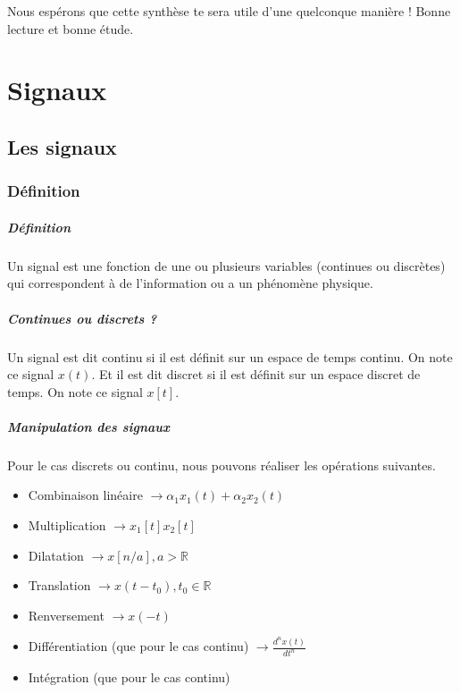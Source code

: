 \documentclass{report}
\begin{document}
Nous espérons que cette synthèse te sera utile d'une quelconque manière ! Bonne lecture et bonne étude.


\part{Signaux}

\chapter{Les signaux}
\section{Définition}
\subsubsection{Définition}
Un signal est une fonction de une ou plusieurs variables (continues ou discrètes) qui correspondent à de l'information ou a un phénomène physique.

\subsubsection{Continues ou discrets ?}
Un signal est dit continu si il est définit sur un espace de temps continu. On note ce signal $x(t)$. Et il est dit discret si il est définit sur un espace discret de temps. On note ce signal $x[t]$.

\subsubsection{Manipulation des signaux}
Pour le cas discrets ou continu, nous pouvons réaliser les opérations suivantes.
\begin{itemize}
\item Combinaison linéaire $\rightarrow \alpha_{1}x_{1}(t) + \alpha_{2}x_{2}(t)$
\item Multiplication $ \rightarrow x_{1}[t]x_{2}[t]$
\item Dilatation $ \rightarrow x[n/a], a > \mathbb{R}$
\item Translation $ \rightarrow x(t - t_0), t_0 \in \mathbb{R}$
\item Renversement $ \rightarrow x(-t)$
\item Différentiation (que pour le cas continu) $ \rightarrow \frac{d^n x(t)}{dt^n}$
\item Intégration (que pour le cas continu)
\end{itemize}
\end{document}
